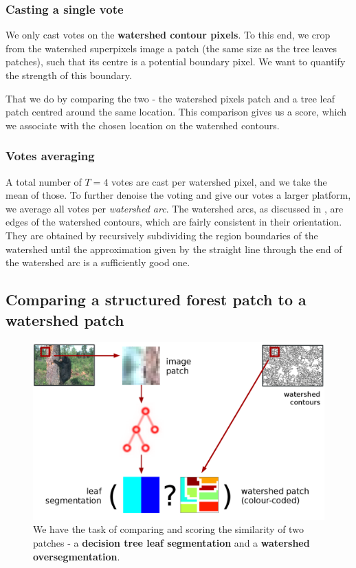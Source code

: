 \subsubsection{Casting a single vote}
We only cast votes on the {\bf watershed contour pixels}. To this end, we crop from the watershed superpixels image a patch (the same size as the tree leaves patches), such that its centre is a potential boundary pixel. We want to quantify the strength of this boundary. 

That we do by comparing the two - the watershed pixels patch and a tree leaf patch centred around the same location. This comparison gives us a score, which we associate with the chosen location on the watershed contours.

\subsubsection{Votes averaging}
A total number of $T=4$ votes are cast per watershed pixel, and we take the mean of those. To further denoise the voting and give our votes a larger platform, %
we average all votes per \textit{watershed arc}. The watershed arcs, as discussed in , are edges of the watershed contours, which are fairly consistent in their orientation. They are obtained by recursively subdividing the region boundaries of the watershed until the approximation given by the straight line through the end of the watershed arc is a sufficiently good one. %

\subsection{Comparing a structured forest patch to a watershed patch}
\begin{figure}[ht!]
\centering
 \includegraphics[width=1\textwidth]{images/SE-SV-UCM/weighting-the-watershed-contours-two-patches.png}
\caption[Structured voting essence: a comparison of two patches]{We have the task of comparing and scoring the similarity of two patches - a \textbf{decision tree leaf segmentation} and a \textbf{watershed oversegmentation}.}
\label{fig:weighting-the-watershed-contours}
\end{figure}

